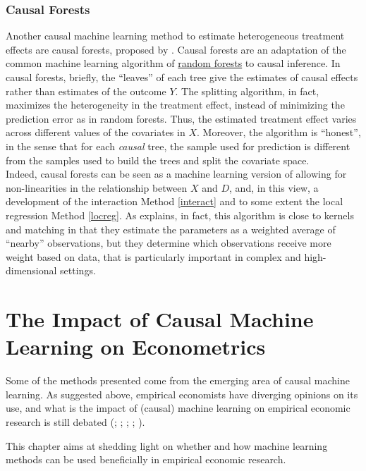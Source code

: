 \documentclass[12pt,a4paper,openright,twoside]{book}
\newcommand{\customref}[2]{\hyperref[#1]{#2}}
\begin{document}
\begin{doublespacing}
\subsection{Causal Forests} \label{cf}
Another causal machine learning method to estimate heterogeneous treatment effects are causal forests, proposed by \citet{wagerathey2018}. Causal forests are an adaptation of the common machine learning algorithm of \customref{rf}{random forests} to causal inference. In causal forests, briefly, the ``leaves'' of each tree give the estimates of causal effects rather than estimates of the outcome $Y$. The splitting algorithm, in fact, maximizes the heterogeneity in the treatment effect, instead of minimizing the prediction error as in random forests. Thus, the estimated treatment effect varies across different values of the covariates in $X$. Moreover, the algorithm is ``honest'', in the sense that for each \textit{causal} tree, the sample used for prediction is different from the samples used to build the trees and split the covariate space. \\

Indeed, causal forests can be seen as a machine learning version of allowing for non-linearities in the relationship between $X$ and $D$, and, in this view, a development of the interaction Method \ref{interact} and to some extent the local regression Method \ref{locreg}. As \citet{wagerathey2018} explains, in fact, this algorithm is close to kernels and matching in that they estimate the parameters as a weighted average of ``nearby'' observations, but they determine which observations receive more weight based on data, that is particularly important in complex and high-dimensional settings.  

\chapter{The Impact of Causal Machine Learning on Econometrics} \label{chap2}

Some of the methods presented come from the emerging area of causal machine learning. As suggested above, empirical economists have diverging opinions on its use, and what is the impact of (causal) machine learning on empirical economic research is still debated (\citealp{athey2019}; \citealp{bankarticle}; \citealp{dorie2019automated}; \citealp{heckmanpinto2022}; \citealp{videoimbangr}). 

This chapter aims at shedding light on whether and how machine learning methods can be used beneficially in empirical economic research. 


\end{doublespacing}
\end{document}
